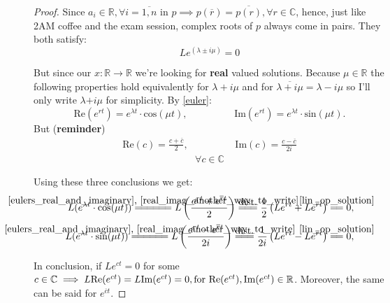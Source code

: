 \begin{proof}
	Since $a_i \in \mathbb{R}, \forall i=\overline{1,n}$ in $p \implies p(\overline{r})=\overline{p(r)}, \forall r \in \mathbb{C}$, hence, just like 2AM coffee and the exam session, complex roots of $p$ always come in pairs. They both satisfy:
	\begin{equation}\label{lin_op_solution}
		Le^{(\lambda \pm i \mu)} = 0
	\end{equation}

	But since our $x : \mathbb{R} \rightarrow \mathbb{R}$ we're looking for \textbf{real} valued solutions.
	Because $\mu \in \mathbb{R}$ the following properties hold equivalently for $\lambda + i\mu$ and for $\overline{\lambda + i\mu}=\lambda - i\mu$ so I'll only write $\lambda \textbf{+} i \mu$ for simplicity. By \ref{euler}:
	\begin{equation}\label{eulers_real_and_imaginary}
		\text{Re}(e^{rt})=e^{\lambda t} \cdot \text{cos}(\mu t), \hspace{2cm}    \text{Im}(e^{rt}) = e^{\lambda t} \cdot \text{sin}(\mu t).
	\end{equation}
	But (\textbf{reminder})
	\begin{gather}\label{real_imag_another_way_to_write}
		\text{Re}(c)= \frac{c+\overline{c}}{2}, \hspace{2cm}
		\text{Im}(c) = \frac{c-\overline{c}}{2i}
	\end{gather}
	\begin{gather*}
		\forall c \in \mathbb{C}
	\end{gather*}

	\newcommand\firstConclusion{\stackrel{\mathclap{\normalfont\mbox{\ref{eulers_real_and_imaginary}, \ref{real_imag_another_way_to_write}}}}{=\joinrel=\joinrel=\joinrel=\joinrel=\joinrel=}}

	\newcommand\byDistributivity{\stackrel{\mathclap{\normalfont\mbox{dist.}}}{=\joinrel=\joinrel=}}

	\newcommand\operatorSatisfy{\stackrel{\mathclap{\normalfont\mbox{\ref{lin_op_solution}}}}{=\joinrel=}}

	Using these three conclusions we get:
	\begin{align*}
		L(e^{\lambda t} \cdot \text{cos}(\mu t)) \firstConclusion
		L\left(\frac{e^{rt}+e^{\overline{r}t}}{2} \right) \byDistributivity
		\frac{1}{2} \left( Le^{rt} + Le^{\overline{r}t} \right) \operatorSatisfy 0 , \\
		L(e^{\lambda t} \cdot \text{sin}(\mu t)) \firstConclusion
		L\left(\frac{e^{rt}-e^{\overline{r}t}}{2i} \right) \byDistributivity
		\frac{1}{2i} \left( Le^{rt} - Le^{\overline{r}t} \right) \operatorSatisfy 0 ,
	\end{align*}

	In conclusion, if $Le^{ct}=0$ for some $c \in \mathbb{C} \implies L\text{Re}(e^{ ct })= L\text{Im}(e^{ct})=0, \\
	\text{for } \text{Re}(e^{ct}), \text{Im}(e^{ct}) \in \mathbb{R}$.
	Moreover, the same can be said for $e^{\overline{c}t}$.
\end{proof}


